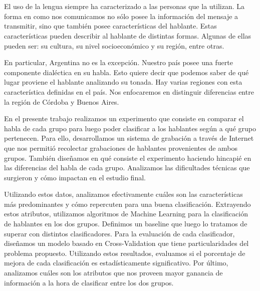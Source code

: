 \chapter*{\runtitulo}

\noindent 

El uso de la lengua siempre ha caracterizado a las personas que la utilizan. La forma en como nos comunicamos no sólo posee la información del mensaje a transmitir, sino que también posee características del hablante. Estas características pueden describir al hablante de distintas formas. Algunas de ellas pueden ser: su cultura, su nivel socioeconómico y su región, entre otras.
 
En particular, Argentina no es la excepción. Nuestro país posee una fuerte componente dialéctica en su habla. Esto quiere decir que podemos saber de qué lugar proviene el hablante analizando su tonada. Hay varias regiones con esta característica definidas en el país. Nos enfocaremos en distinguir diferencias entre la región de Córdoba y Buenos Aires.

En el presente trabajo realizamos un experimento que consiste en comparar el habla de cada grupo para luego poder clasificar a los hablantes según a qué grupo pertenecen. Para ello, desarrollamos un sistema de grabación a través de Internet que nos permitió recolectar grabaciones de hablantes provenientes de  ambos grupos. También diseñamos en qué consiste el experimento haciendo hincapié en las diferencias del habla de cada grupo. Analizamos las dificultades técnicas que surgieron y cómo impactan en el estudio final.

Utilizando estos datos, analizamos efectivamente cuáles son las características más predominantes y cómo repercuten para una buena clasificación. Extrayendo estos atributos, utilizamos algoritmos de Machine Learning para la clasificación de hablantes en los dos grupos. Definimos un baseline que luego lo tratamos de superar con distintos clasificadores. Para la evaluación de cada clasificador, diseñamos un modelo basado en Cross-Validation que tiene particularidades del problema propuesto. Utilizando estos resultados, evaluamos si el porcentaje de mejora de cada clasificación es estadísticamente significativo. Por último, analizamos cuáles son los atributos que nos proveen mayor ganancia de información a la hora de clasificar entre los dos grupos.


\bigskip
